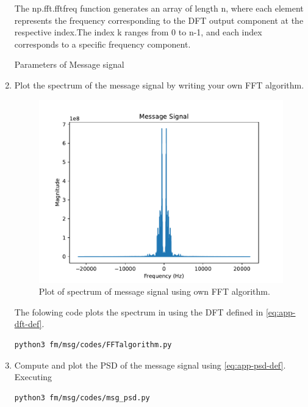 \begin{enumerate}[label=\arabic*.,ref=\thesection.\theenumi]
The np.fft.fftfreq function generates an array of length n, where each element represents the frequency corresponding to the DFT output component at the respective index.The index k ranges from 0 to n-1, and each index corresponds to a specific frequency component.\\
\begin{table}
  \centering
  
  \caption{Parameters of Message signal}
  \label{4.1}
\end{table}
\item Plot the spectrum of the message signal by writing your own FFT algorithm.\\
	\solution
\begin{figure}[H]
\centering
\includegraphics[width=\columnwidth]{fm/msg/figs/FFTalgorithm.pdf}
\caption{Plot of spectrum of message signal using own FFT algorithm.}
\label{fig:FFTo}
\end{figure}
The folowing code plots the spectrum in  using the DFT defined in  \eqref{eq:app-dft-def}.
\begin{lstlisting}
python3 fm/msg/codes/FFTalgorithm.py
\end{lstlisting}
\item Compute and plot the PSD of the message signal using 
\eqref{eq:app-psd-def}.
\\
	\solution
Executing	
\begin{lstlisting}
python3 fm/msg/codes/msg_psd.py
\end{lstlisting}


\end{enumerate}
